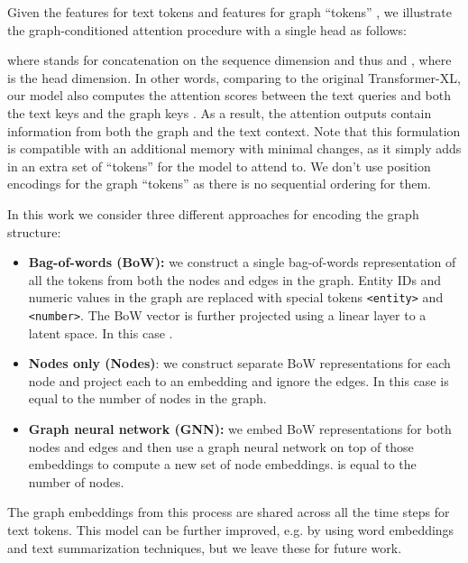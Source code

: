 \documentclass[11pt]{article}
\begin{document}
Given the features for  text tokens  and features for  graph ``tokens'' , we illustrate the graph-conditioned attention procedure with a single head as follows:

where  stands for concatenation on the sequence dimension and thus  and , where  is the head dimension.
In other words, comparing to the original Transformer-XL, our model also computes the attention scores between the text queries  and both the text keys  and the graph keys .
As a result, the attention outputs contain information from both the graph and the text context. Note that this formulation is compatible with an additional memory \cite{dai2019transformer} with minimal changes, as it simply adds in an extra set of ``tokens'' for the model to attend to.  We don't use position encodings for the graph ``tokens'' as there is no sequential ordering for them.


In this work we consider three different approaches for encoding the graph structure:
\begin{itemize}
    \item \textbf{Bag-of-words (BoW):}
we construct a single bag-of-words representation of all the tokens from both the nodes and edges in the graph.
Entity IDs and numeric values in the graph are replaced with special tokens \texttt{<entity>} and \texttt{<number>}. The BoW vector is further projected using a linear layer to a latent space. In this case .
    \item \textbf{Nodes only (Nodes)}: we construct separate BoW representations for each node and project each to an embedding and ignore the edges. In this case  is equal to the number of nodes in the graph.
    \item \textbf{Graph neural network (GNN):} we embed BoW representations for both nodes and edges and then use a graph neural network  \cite{battaglia2018relational} on top of those embeddings to compute a new set of node embeddings.  is equal to the number of nodes.
\end{itemize}
The  graph embeddings from this process are shared across all the time steps for text tokens.
This model can be further improved, e.g. by using word embeddings and text summarization techniques, but we leave these for future work.
\end{document}
